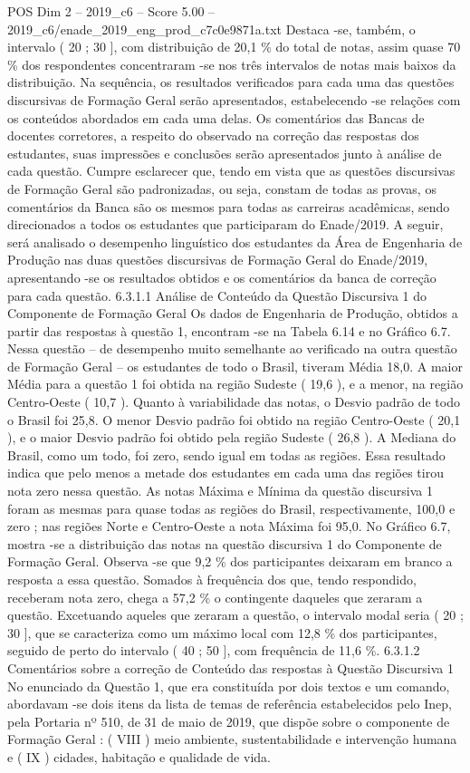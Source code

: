 \begin{textsample}{POS Dim 2 – 2019\_c6 – Score 5.00 – 2019\_c6/enade\_2019\_eng\_prod\_c7c0e9871a.txt}
Destaca -se, também, o intervalo ( 20 ; 30 ], com distribuição de 20,1 \% do total de notas, assim quase 70 \% dos respondentes concentraram -se nos três intervalos de notas mais baixos da distribuição.
Na sequência, os resultados verificados para cada uma das questões discursivas de Formação Geral serão apresentados, estabelecendo -se relações com os conteúdos abordados em cada uma delas.
Os comentários das Bancas de docentes corretores, a respeito do observado na correção das respostas dos estudantes, suas impressões e conclusões serão apresentados junto à análise de cada questão.
Cumpre esclarecer que, tendo em vista que as questões discursivas de Formação Geral são padronizadas, ou seja, constam de todas as provas, os comentários da Banca são os mesmos para todas as carreiras acadêmicas, sendo direcionados a todos os estudantes que participaram do Enade/2019.
A seguir, será analisado o desempenho linguístico dos estudantes da Área de Engenharia de Produção nas duas questões discursivas de Formação Geral do Enade/2019, apresentando -se os resultados obtidos e os comentários da banca de correção para cada questão. 6.3.1.1 Análise de Conteúdo da Questão Discursiva 1 do Componente de Formação Geral Os dados de Engenharia de Produção, obtidos a partir das respostas à questão 1, encontram -se na Tabela 6.14 e no Gráfico 6.7.
Nessa questão – de desempenho muito semelhante ao verificado na outra questão de Formação Geral – os estudantes de todo o Brasil, tiveram Média 18,0.
A maior Média para a questão 1 foi obtida na região Sudeste ( 19,6 ), e a menor, na região Centro-Oeste ( 10,7 ).
Quanto à variabilidade das notas, o Desvio padrão de todo o Brasil foi 25,8.
O menor Desvio padrão foi obtido na região Centro-Oeste ( 20,1 ), e o maior Desvio padrão foi obtido pela região Sudeste ( 26,8 ).
A Mediana do Brasil, como um todo, foi zero, sendo igual em todas as regiões.
Essa resultado indica que pelo menos a metade dos estudantes em cada uma das regiões tirou nota zero nessa questão.
As notas Máxima e Mínima da questão discursiva 1 foram as mesmas para quase todas as regiões do Brasil, respectivamente, 100,0 e zero ; nas regiões Norte e Centro-Oeste a nota Máxima foi 95,0.
No Gráfico 6.7, mostra -se a distribuição das notas na questão discursiva 1 do Componente de Formação Geral.
Observa -se que 9,2 \% dos participantes deixaram em branco a resposta a essa questão.
Somados à frequência dos que, tendo respondido, receberam nota zero, chega a 57,2 \% o contingente daqueles que zeraram a questão.
Excetuando aqueles que zeraram a questão, o intervalo modal seria ( 20 ; 30 ], que se caracteriza como um máximo local com 12,8 \% dos participantes, seguido de perto do intervalo ( 40 ; 50 ], com frequência de 11,6 \%. 6.3.1.2 Comentários sobre a correção de Conteúdo das respostas à Questão Discursiva 1 No enunciado da Questão 1, que era constituída por dois textos e um comando, abordavam -se dois itens da lista de temas de referência estabelecidos pelo Inep, pela Portaria nº 510, de 31 de maio de 2019, que dispõe sobre o componente de Formação Geral : ( VIII ) meio ambiente, sustentabilidade e intervenção humana e ( IX ) cidades, habitação e qualidade de vida.

\end{textsample}
